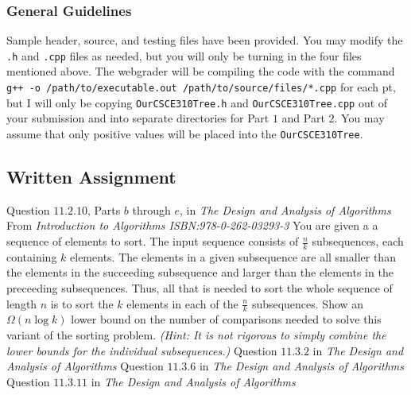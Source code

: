 \documentclass[addpoints,letter,11pt]{exam}
\begin{document}
\subsubsection*{General Guidelines}
Sample header, source, and testing files have been provided. You may modify the \verb+.h+ and \verb+.cpp+ files as needed, but you will only be turning in the four files mentioned above. The webgrader will be compiling the code with the command \verb|g++ -o /path/to/executable.out /path/to/source/files/*.cpp| for each pt, but I will only be copying \verb+OurCSCE310Tree.h+ and \verb+OurCSCE310Tree.cpp+ out of your submission and into separate directories for Part $1$ and Part $2$. You may assume that only positive values will be placed into the \verb+OurCSCE310Tree+.

\subsection*{Written Assignment}
\begin{questions}
  \question[10]
  Question $11.2.10$, Parts $b$ through $e$, in \emph{The Design and Analysis of Algorithms}
  \question[10]
  From \emph{Introduction to Algorithms ISBN:978-0-262-03293-3}
  You are given a a sequence of elements to sort. The input sequence consists of $\frac{n}{k}$ subsequences, each containing $k$ elements. The elements in a given subsequence are all smaller than the elements in the succeeding subsequence and larger than the elements in the preceeding subsequences. Thus, all that is needed to sort the whole sequence of length $n$ is to sort the $k$ elements in each of the $\frac{n}{k}$ subsequences. Show an $\Omega\left(n\log k\right)$ lower bound on the number of comparisons needed to solve this variant of the sorting problem. \emph{(Hint: It is not rigorous to simply combine the lower bounds for the individual subsequences.)}
  \question[10]
  Question $11.3.2$ in \emph{The Design and Analysis of Algorithms}
  \question[10]
  Question $11.3.6$ in \emph{The Design and Analysis of Algorithms}
  \question[10]
  Question $11.3.11$ in \emph{The Design and Analysis of Algorithms}
\end{questions}

\end{document}

